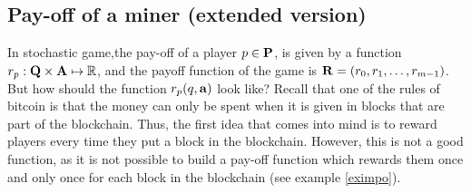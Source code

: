 \iffalse

\subsection{Pay-off of a miner (extended version)}



In stochastic game,the pay-off of a player $p \in \mathbf{P}$, is given by a function $r_p: \mathbf{Q} \times \mathbf{A} \mapsto \mathbb{R}$, and the payoff function of the game is $\mathbf{R} = (r_0, r_1, \ldots, r_{m-1})$.
But how should the function $r_p(q,\mathbf{a})$ look like? Recall that one of the rules of bitcoin is that the money can only
be spent when it is given in blocks that are part of the blockchain. Thus, the first idea that comes into mind is to
reward players every time they put a block in the blockchain. However, this is not a good function, as it is not possible to build a pay-off function which rewards them once and only once for each block in the blockchain (see example \ref{eximpo}).

